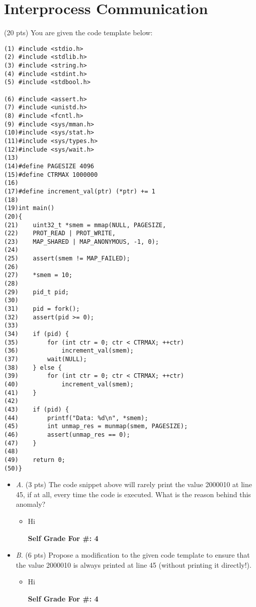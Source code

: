 \documentclass[conference]{IEEEtran}
\begin{document}
\section{Interprocess Communication}
(20 pts) You are given the code template below:
\begin{lstlisting}
(1) #include <stdio.h>
(2) #include <stdlib.h>
(3) #include <string.h>
(4) #include <stdint.h>
(5) #include <stdbool.h>

(6) #include <assert.h>
(7) #include <unistd.h>
(8) #include <fcntl.h>
(9) #include <sys/mman.h>
(10)#include <sys/stat.h>
(11)#include <sys/types.h>
(12)#include <sys/wait.h>
(13)
(14)#define PAGESIZE 4096
(15)#define CTRMAX 1000000
(16)
(17)#define increment_val(ptr) (*ptr) += 1
(18)
(19)int main()
(20){
(21)	uint32_t *smem = mmap(NULL, PAGESIZE,
(22)	PROT_READ | PROT_WRITE,
(23)	MAP_SHARED | MAP_ANONYMOUS, -1, 0);
(24)
(25)	assert(smem != MAP_FAILED);
(26)
(27)	*smem = 10;
(28)
(29)	pid_t pid;
(30)
(31)	pid = fork();
(32)	assert(pid >= 0);
(33)
(34)	if (pid) {
(35)		for (int ctr = 0; ctr < CTRMAX; ++ctr)
(36)			increment_val(smem);
(37)		wait(NULL);
(38)	} else {
(39)		for (int ctr = 0; ctr < CTRMAX; ++ctr)
(40)			increment_val(smem);
(41)	}
(42)
(43)	if (pid) {
(44)		printf("Data: %d\n", *smem);
(45)		int unmap_res = munmap(smem, PAGESIZE);
(46)		assert(unmap_res == 0);
(47)	}
(48)
(49)	return 0;
(50)}
\end{lstlisting}

\begin{itemize}
\item \textit{A}. (3 pts) The code snippet above will rarely print the value 2000010 at line 45, if at all, every
time the code is executed. What is the reason behind this anomaly?
\begin{itemize} 
	\item Hi
	
	\begin{center}
		\textbf{Self Grade For \#: 4}
	\end{center}
\end{itemize}
\end{itemize}

\begin{itemize}
	\item \textit{B}. (6 pts) Propose a modification to the given code template to ensure that the value 2000010 is
	always printed at line 45 (without printing it directly!).
	\begin{itemize} 
	\item Hi
		
		\begin{center}
			\textbf{Self Grade For \#: 4}
		\end{center}
	\end{itemize}
\end{itemize}
\end{document}
